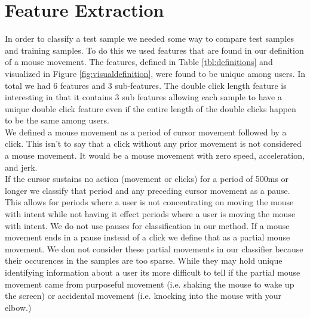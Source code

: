 \documentclass[conference]{IEEEtran}
\begin{document}
\section{Feature Extraction}
    In order to classify a test sample we needed some way to compare test samples and training samples. To do this we used features that are found in our definition of a mouse movement. The features, defined in Table \ref{tbl:definitions} and visualized in Figure \ref{fig:visualdefinition}, were found to be unique among users. In total we had 6 features and 3 sub-features. The double click length feature is interesting in that it contains 3 sub features allowing each sample to have a unique double click feature even if the entire length of the double clicks happen to be the same among users.\\
	We defined a mouse movement as a period of cursor movement followed by a click. This isn't to say that a click without any prior movement is not considered a mouse movement. It would be a mouse movement with zero speed, acceleration, and jerk. \\
	If the cursor sustains no action (movement or clicks) for a period of 500ms or longer we classify that period and any preceding cursor movement as a pause. This allows for periods where a user is not concentrating on moving the mouse with intent while not having it effect periods where a user is moving the mouse with intent. We do not use pauses for classification in our method. If a mouse movement ends in a pause instead of a click we define that as a partial mouse movement. We don not consider these partial movements in our classifier because their occurences in the samples are too sparse. While they may hold unique identifying information about a user its more difficult to tell if the partial mouse movement came from purposeful movement (i.e. shaking the mouse to wake up the screen) or accidental movement (i.e. knocking into the mouse with your elbow.)

\bgroup
\end{document}
